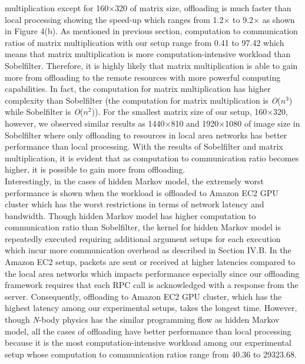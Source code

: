 \documentclass[conference]{IEEEtran}
\begin{document}
multiplication except for 160$\times$320 of matrix size, offloading is
much faster than local processing showing the speed-up which ranges from
1.2$\times$ to 9.2$\times$ as shown in Figure 4(b).
%
As mentioned in previous section, computation to communication ratios 
of matrix multiplication with our setup range from 0.41 to 97.42 
which means that matrix multiplication is more computation-intensive workload 
than Sobelfilter. 
%
Therefore, it is highly likely that matrix multiplication is able to
gain more from offloading to the remote resources with more powerful
computing capabilities.
%
In fact, the computation for matrix multiplication has higher complexity
than Sobelfilter (the computation for matrix multiplication is
\textit{O}($n^{3}$) while Sobelfilter is \textit{O}($n^{2}$)).
%
For the smallest matrix size of our setup, 160$\times$320, however,
we observed similar results as 1440$\times$810 and 1920$\times$1080 of
image size in Sobelfilter where only offloading to resources in local
area networks has better performance than local processing.
%
With the results of Sobelfilter and matrix multiplication, it is evident
that as computation to communication ratio becomes higher, 
it is possible to gain more from offloading.\\
%
\indent Interestingly, in the cases of hidden Markov model, the
extremely worst performance is shown when the workload is offloaded to
Amazon EC2 GPU cluster which has the worst restrictions in terms of
network latency and bandwidth.
%
Though hidden Markov model has higher computation to communication
ratio than Sobelfilter, the kernel for hidden Markov model is repeatedly executed 
requiring additional argument setups for each execution which incur 
more communication overhead as described in Section IV.B.
%
In the Amazon EC2 setup, packets are sent or received at higher
latencies compared to the local area networks which impacts performance
especially since our offloading framework requires that each RPC call is
acknowledged with a response from the server.
%
Consequently, offloading to Amazon EC2 GPU cluster, which has the
highest latency among our experimental setups, takes the longest time.
%
However, though \textit{N}-body physics has the similar programming flow
as hidden Markov model, all the cases of offloading have better
performance than local processing because it is the most
computation-intensive workload among our experimental setup whose
computation to communication ratios range from 40.36 to 29323.68. 
%
\end{document}
